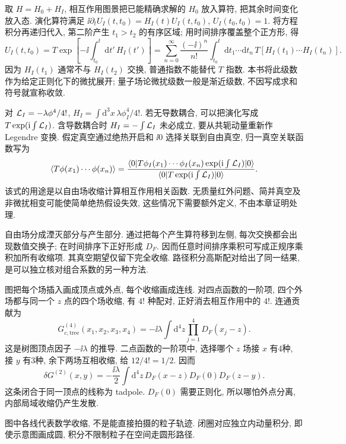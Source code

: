 \label{ch:perturbation}
取 $H=H_0+H_I$, 相互作用图景把已能精确求解的 $H_0$ 放入算符, 把其余时间变化放入态. 演化算符满足 $\ii\partial_tU_I(t,t_0)=H_I(t)U_I(t,t_0)$, $U_I(t_0,t_0)=1$. 将方程积分再递归代入, 第二阶产生 $t_1>t_2$ 的有序区域; 用时间排序覆盖整个正方形, 得
\[
U_I(t,t_0)=T\exp\left[-\ii\int_{t_0}^{t}\mathrm dt'\,H_I(t')\right]
=\sum_{n=0}^\infty\frac{(-\ii)^n}{n!}\int_{t_0}^{t}\mathrm dt_1\cdots\mathrm dt_n\,
T[H_I(t_1)\cdots H_I(t_n)].
\]
因为 $H_I(t_1)$ 通常不与 $H_I(t_2)$ 交换, 普通指数不能替代 $T$ 指数. 本书将此级数作为给定正则化下的微扰展开; 量子场论微扰级数一般是渐近级数, 不因写成求和符号就宣称收敛.

对 $\mathcal L_I=-\lambda\phi^4/4!$, $H_I=\int\mathrm d^3x\,\lambda\phi_I^4/4!$. 若无导数耦合, 可以把演化写成 $T\exp(\mathrm i\int\mathcal L_I)$. 含导数耦合时 $H_I=-\int\mathcal L_I$ 未必成立, 要从共轭动量重新作 Legendre 变换. 假定真空通过绝热开启和 $\ii0$ 选择关联到自由真空, 归一真空关联函数写为
\begin{equation}\label{eq:GM-low}
\langle T\phi(x_1)\cdots\phi(x_n)\rangle
=\frac{\langle 0\rvert T\phi_I(x_1)\cdots\phi_I(x_n)\exp(\mathrm i\int\mathcal L_I)\lvert 0\rangle}
{\langle 0\rvert T\exp(\mathrm i\int\mathcal L_I)\lvert 0\rangle}.
\end{equation}
该式的用途是以自由场收缩计算相互作用相关函数. 无质量红外问题、简并真空及非微扰相变可能使简单绝热假设失效, 这些情况下需要额外定义, 不由本章证明处理.

自由场分成湮灭部分与产生部分. 通过把每个产生算符移到左侧, 每次交换都会出现数值交换子; 在时间排序下正好形成 $D_F$. 因而任意时间排序乘积可写成正规序乘积加所有收缩项. 其真空期望仅留下完全收缩. 路径积分高斯配对给出了同一结果, 是可以独立核对组合系数的另一种方法.

图把每个场插入画成顶点或外点, 每个收缩画成连线. 对四点函数的一阶项, 四个外场都与同一个 $z$ 点的四个场收缩, 有 $4!$ 种配对, 正好消去相互作用中的 $4!$. 连通贡献为
\[
G^{(4)}_{c,\mathrm{tree}}(x_1,x_2,x_3,x_4)
=-\ii\lambda\int\mathrm d^4z\prod_{j=1}^4D_F(x_j-z).
\]
这是树图顶点因子 $-\ii\lambda$ 的推导. 二点函数的一阶项中, 选择哪个 $z$ 场接 $x$ 有4种, 接 $y$ 有3种, 余下两场互相收缩, 给 $12/4!=1/2$. 因而
\[
\delta G^{(2)}(x,y)=-\frac{\ii\lambda}2\int\mathrm d^4z\,
D_F(x-z)D_F(0)D_F(z-y).
\]
这条闭合于同一顶点的线称为 tadpole. $D_F(0)$ 需要正则化, 所以哪怕外点分离, 内部局域收缩仍产生发散.

\begin{center}
\end{center}
图中各线代表数学收缩, 不是能直接拍摄的粒子轨迹. 闭圈对应独立内动量积分, 即使示意图画成圆, 积分不限制粒子在空间走圆形路径.

